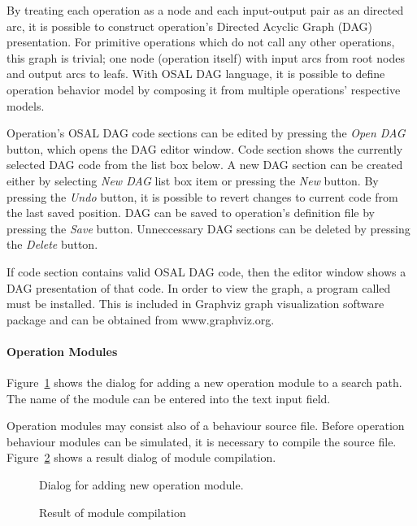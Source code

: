 \documentclass[twoside]{tceusermanual}
\begin{document}
By treating each operation as a node and each input-output pair as an directed
arc, it is possible to construct operation's Directed Acyclic Graph (DAG)
presentation. For primitive operations which do not call any other operations,
this graph is trivial; one node (operation itself) with input arcs from root
nodes and output arcs to leafs. With OSAL DAG language, it is possible to
define operation behavior model by composing it from multiple operations'
respective models.

Operation's OSAL DAG code sections can be edited by pressing the \emph{Open DAG}
button, which opens the DAG editor window. Code section shows the currently
selected DAG code from the list box below. A new DAG section can be created
either by selecting \emph{New DAG} list box item or pressing the \emph{New} button.
By pressing the \emph{Undo} button, it is possible to revert changes to current
code from the last saved position. DAG can be saved to operation's definition
file by pressing the \emph{Save} button. Unneccessary DAG sections can be deleted
by pressing the \emph{Delete} button.

If code section contains valid OSAL DAG code, then the editor window shows
a DAG presentation of that code.  In order to view the graph, a
program called  must be installed. This is included in Graphviz graph
visualization software package and can be obtained from www.graphviz.org. 

\paragraph{Operation Modules}

Figure~\ref{fig:osed_add_module_dialog} shows the dialog for adding a new
operation module to a search path. The name of the module can be entered
into the text input field.  

Operation modules may consist also of a behaviour source file. Before
operation behaviour modules can be simulated, it is necessary to compile the
source file.  Figure~\ref{fig:osed_build_result_dialog} shows a result dialog of
module compilation. 

%
\begin{figure}[tb]
\centerline{}
\caption{Dialog for adding new operation module.}
\label{fig:osed_add_module_dialog}
\end{figure}
%
\begin{figure}[tb]
\centerline{}
\caption{Result of module compilation}
\label{fig:osed_build_result_dialog}
\end{figure}
\end{document}

